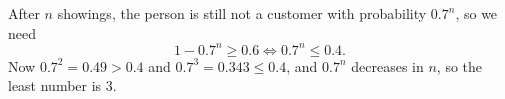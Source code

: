 After $n$ showings, the person is still not a customer with probability $0.7^n$, so we need
\[
1-0.7^n\ge0.6\iff0.7^n\le0.4 .
\]
Now $0.7^2=0.49>0.4$ and $0.7^3=0.343\le0.4$, and $0.7^n$ decreases in $n$, so the least number is $\boxed{3}$.
